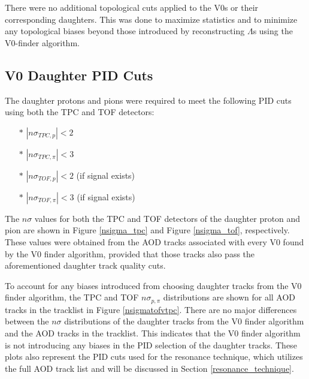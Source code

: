 \documentclass[ALICE,manyauthors]{ALICE_analysis_notes}
\begin{document}
There were no additional topological cuts applied to the V0s or their corresponding daughters. This was done to maximize statistics and to minimize any topological biases beyond those introduced by reconstructing $\Lambda$s using the V0-finder algorithm.

\subsection{V0 Daughter PID Cuts}
\label{v0_daughter_pid}
The daughter protons and pions were required to meet the following PID cuts using both the TPC and TOF detectors:

\begin{itemize}
	\item[$\ast$] $|n\sigma_{TPC, p}| < 2$
	\item[$\ast$] $|n\sigma_{TPC, \pi}| < 3$
	\item[$\ast$] $|n\sigma_{TOF, p}| < 2$ (if signal exists)
	\item[$\ast$] $|n\sigma_{TOF, \pi}| < 3$ (if signal exists)
\end{itemize}

The $n\sigma$ values for both the TPC and TOF detectors of the daughter proton and pion are shown in Figure \ref{nsigma_tpc} and Figure \ref{nsigma_tof}, respectively. These values were obtained from the AOD tracks associated with every V0 found by the V0 finder algorithm, provided that those tracks also pass the aforementioned daughter track quality cuts.

To account for any biases introduced from choosing daughter tracks from the V0 finder algorithm, the TPC and TOF $n\sigma_{p, \pi}$ distributions are shown for all AOD tracks in the tracklist in Figure \ref{nsigmatofvtpc}. There are no major differences between the $n\sigma$ distributions of the daughter tracks from the V0 finder algorithm and the AOD tracks in the tracklist. This indicates that the V0 finder algorithm is not introducing any biases in the PID selection of the daughter tracks. These plots also represent the PID cuts used for the resonance technique, which utilizes the full AOD track list and will be discussed in Section \ref{resonance_technique}.
\end{document}
